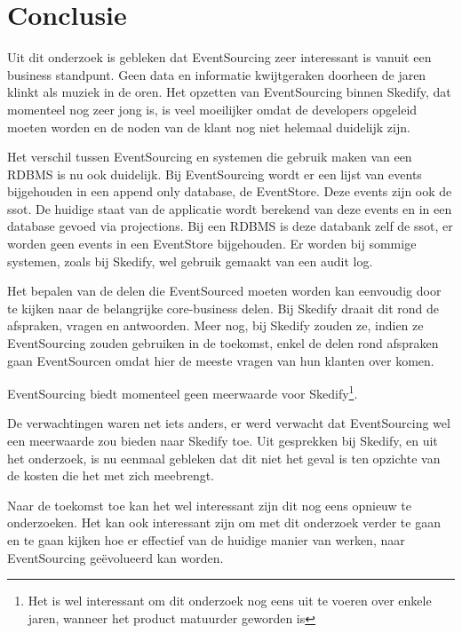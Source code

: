
\chapter{Conclusie}
\label{ch:conclusie}


Uit dit onderzoek is gebleken dat EventSourcing zeer interessant is vanuit een business standpunt. Geen data en informatie kwijtgeraken doorheen de jaren klinkt als muziek in de oren. Het opzetten van EventSourcing binnen Skedify, dat momenteel nog zeer jong is, is veel moeilijker omdat de developers opgeleid moeten worden en de noden van de klant nog niet helemaal duidelijk zijn.

Het verschil tussen EventSourcing en systemen die gebruik maken van een \gls{RDBMS} is nu ook duidelijk. Bij EventSourcing wordt er een lijst van events bijgehouden in een append only database, de EventStore. Deze events zijn ook de \gls{ssot}. De huidige staat van de applicatie wordt berekend van deze events en in een database gevoed via projections. Bij een \gls{RDBMS} is deze databank zelf de \gls{ssot}, er worden geen events in een EventStore bijgehouden. Er worden bij sommige systemen, zoals bij Skedify, wel gebruik gemaakt van een audit log.

Het bepalen van de delen die EventSourced moeten worden kan eenvoudig door te kijken naar de belangrijke core-business delen. Bij Skedify draait dit rond de afspraken, vragen en antwoorden. Meer nog, bij Skedify zouden ze, indien ze EventSourcing zouden gebruiken in de toekomst, enkel de delen rond afspraken gaan EventSourcen omdat hier de meeste vragen van hun klanten over komen.

EventSourcing biedt momenteel geen meerwaarde voor Skedify\footnote{Het is wel interessant om dit onderzoek nog eens uit te voeren over enkele jaren, wanneer het product matuurder geworden is}.

De verwachtingen waren net iets anders, er werd verwacht dat EventSourcing wel een meerwaarde zou bieden naar Skedify toe. Uit gesprekken bij Skedify, en uit het onderzoek, is nu eenmaal gebleken dat dit niet het geval is ten opzichte van de kosten die het met zich meebrengt.

Naar de toekomst toe kan het wel interessant zijn dit nog eens opnieuw te onderzoeken. Het kan ook interessant zijn om met dit onderzoek verder te gaan en te gaan kijken hoe er effectief van de huidige manier van werken, naar EventSourcing geëvolueerd kan worden.